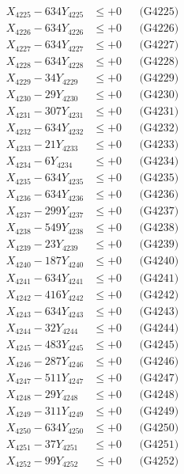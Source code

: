 \documentclass[a4paper,10pt]{article}
\begin{document}
{\begin{align}
X_{4225} - 634Y_{4225} &\leq +0 && \text{(G4225)} \\
X_{4226} - 634Y_{4226} &\leq +0 && \text{(G4226)} \\
X_{4227} - 634Y_{4227} &\leq +0 && \text{(G4227)} \\
X_{4228} - 634Y_{4228} &\leq +0 && \text{(G4228)} \\
X_{4229} - 34Y_{4229} &\leq +0 && \text{(G4229)} \\
X_{4230} - 29Y_{4230} &\leq +0 && \text{(G4230)} \\
\allowbreak
X_{4231} - 307Y_{4231} &\leq +0 && \text{(G4231)} \\
X_{4232} - 634Y_{4232} &\leq +0 && \text{(G4232)} \\
X_{4233} - 21Y_{4233} &\leq +0 && \text{(G4233)} \\
X_{4234} - 6Y_{4234} &\leq +0 && \text{(G4234)} \\
X_{4235} - 634Y_{4235} &\leq +0 && \text{(G4235)} \\
X_{4236} - 634Y_{4236} &\leq +0 && \text{(G4236)} \\
X_{4237} - 299Y_{4237} &\leq +0 && \text{(G4237)} \\
X_{4238} - 549Y_{4238} &\leq +0 && \text{(G4238)} \\
X_{4239} - 23Y_{4239} &\leq +0 && \text{(G4239)} \\
X_{4240} - 187Y_{4240} &\leq +0 && \text{(G4240)} \\
\allowbreak
X_{4241} - 634Y_{4241} &\leq +0 && \text{(G4241)} \\
X_{4242} - 416Y_{4242} &\leq +0 && \text{(G4242)} \\
X_{4243} - 634Y_{4243} &\leq +0 && \text{(G4243)} \\
X_{4244} - 32Y_{4244} &\leq +0 && \text{(G4244)} \\
X_{4245} - 483Y_{4245} &\leq +0 && \text{(G4245)} \\
X_{4246} - 287Y_{4246} &\leq +0 && \text{(G4246)} \\
X_{4247} - 511Y_{4247} &\leq +0 && \text{(G4247)} \\
X_{4248} - 29Y_{4248} &\leq +0 && \text{(G4248)} \\
X_{4249} - 311Y_{4249} &\leq +0 && \text{(G4249)} \\
X_{4250} - 634Y_{4250} &\leq +0 && \text{(G4250)} \\
\allowbreak
X_{4251} - 37Y_{4251} &\leq +0 && \text{(G4251)} \\
X_{4252} - 99Y_{4252} &\leq +0 && \text{(G4252)} \\

\end{align}}
\end{document}
